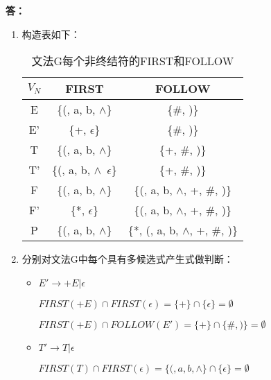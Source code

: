 \begin{enumerate}[1.]
        \textbf{答：}
        
        \begin{enumerate}[(1)]
            \item
            构造表如下：
            \begin{table}[H]
                \centering
                \begin{tabular}{|c|c|c|}
                    \hline
                    $V_N$ & FIRST & FOLLOW \\
                    \hline
                    E & \{(, a, b, $\wedge$\} & \{\#, )\} \\
                    \hline
                    E' & \{+, $\epsilon$\} & \{\#, )\} \\
                    \hline
                    T & \{(, a, b, $\wedge$\} & \{+, \#, )\} \\
                    \hline
                    T' & \{(, a, b, $\wedge$\, $\epsilon$\} & \{+, \#, )\} \\
                    \hline
                    F & \{(, a, b, $\wedge$\} & \{(, a, b, $\wedge$, +, \#, )\} \\
                    \hline
                    F' & \{*, $\epsilon$\} & \{(, a, b, $\wedge$, +, \#, )\} \\
                    \hline
                    P & \{(, a, b, $\wedge$\} & \{*, (, a, b, $\wedge$, +, \#, )\} \\
                    \hline
                \end{tabular}
                \caption{文法G每个非终结符的FIRST和FOLLOW}
                \label{tab:GFF}
            \end{table}
            
            \item
            分别对文法G中每个具有多候选式产生式做判断：
            \begin{itemize}
                \item $E' \to +E | \epsilon$ 
                
                $FIRST(+E) \cap FIRST(\epsilon) = \{+\} \cap \{\epsilon\} = \emptyset$
                
                $FIRST(+E) \cap FOLLOW(E') = \{+\} \cap \{\#, )\} = \emptyset$
                
                \item $T' \to T | \epsilon$
                
                $FIRST(T) \cap FIRST(\epsilon) = \{(, a, b, \wedge\} \cap \{\epsilon\} = \emptyset$
                

\end{itemize}
\end{enumerate}
\end{enumerate}
